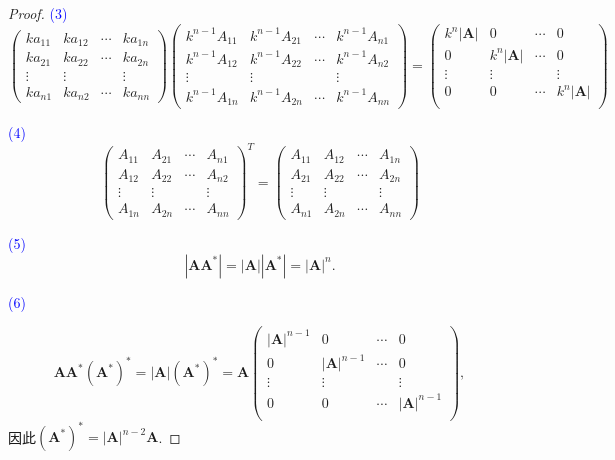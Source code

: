 \documentclass{article}
\newcommand{\mbf}[1]{\bm{#1}}
\newcommand{\bluet}[1]{\textcolor{blue}{#1}}
\begin{document}
\begin{proof}
\rm \bluet{(3)} 
$$
\begin{pmatrix}
ka_{11} & ka_{12} & \cdots & ka_{1n} \\
ka_{21} & ka_{22} & \cdots & ka_{2n} \\
\vdots & \vdots &&\vdots \\
ka_{n1} & ka_{n2} & \cdots & ka_{nn} 
\end{pmatrix}
\begin{pmatrix}
k^{n-1}A_{11} & k^{n-1}A_{21} & \cdots & k^{n-1}A_{n1} \\
k^{n-1}A_{12} & k^{n-1}A_{22} & \cdots & k^{n-1}A_{n2} \\
\vdots & \vdots &&\vdots \\
k^{n-1}A_{1n} & k^{n-1}A_{2n} & \cdots & k^{n-1}A_{nn}
\end{pmatrix}
=\begin{pmatrix}
k^n|\mbf{A}| & 0 & \cdots & 0\\
0 & k^n|\mbf{A}| & \cdots & 0\\
\vdots & \vdots &  & \vdots\\
0 & 0 & \cdots & k^n|\mbf{A}|\\
\end{pmatrix}
$$

\bluet{(4)} 
$$
\begin{pmatrix}
A_{11} & A_{21} & \cdots & A_{n1} \\
A_{12} & A_{22} & \cdots & A_{n2} \\
\vdots & \vdots &&\vdots \\
A_{1n} & A_{2n} & \cdots & A_{nn}
\end{pmatrix}^T = \begin{pmatrix}
A_{11} & A_{12} & \cdots & A_{1n} \\
A_{21} & A_{22} & \cdots & A_{2n} \\
\vdots & \vdots &&\vdots \\
A_{n1} & A_{2n} & \cdots & A_{nn} 
\end{pmatrix}
$$

\bluet{(5)}
$$
|\mbf{A}\mbf{A}^*| = |\mbf{A}||\mbf{A}^*| = |\mbf{A}|^{n}.
$$

\bluet{(6)}

$$
\mbf{A}\mbf{A}^*(\mbf{A}^*)^* = |\mbf{A}|(\mbf{A}^*)^*= \mbf{A} \begin{pmatrix}
|\mbf{A}|^{n-1} & 0 & \cdots & 0\\
0 & |\mbf{A}|^{n-1} & \cdots & 0\\
\vdots & \vdots &  & \vdots\\
0 & 0 & \cdots & |\mbf{A}|^{n-1}\\
\end{pmatrix},
$$
因此$(\mbf{A}^*)^* = |\mbf{A}|^{n-2}\mbf{A}$.
\end{proof}
\end{document}
